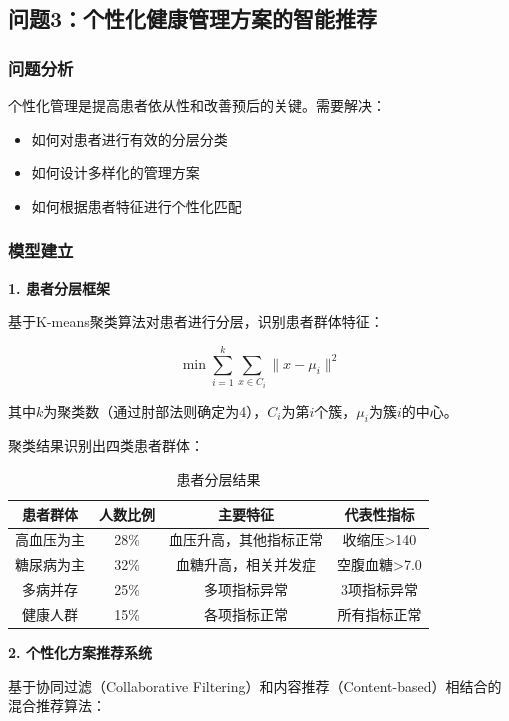 \subsection{问题3：个性化健康管理方案的智能推荐}

\subsubsection{问题分析}

个性化管理是提高患者依从性和改善预后的关键。需要解决：
\begin{itemize}[itemindent=2em]
\item 如何对患者进行有效的分层分类
\item 如何设计多样化的管理方案
\item 如何根据患者特征进行个性化匹配
\end{itemize}

\subsubsection{模型建立}

\textbf{1. 患者分层框架}

基于K-means聚类算法对患者进行分层，识别患者群体特征：

$$\min \sum_{i=1}^{k} \sum_{x \in C_i} \|x - \mu_i\|^2$$

其中$k$为聚类数（通过肘部法则确定为4），$C_i$为第$i$个簇，$\mu_i$为簇$i$的中心。

聚类结果识别出四类患者群体：
\begin{table}[H]
  \centering
  \caption{患者分层结果}
  \label{tab:patient_segmentation}
  \begin{tabularx}{\textwidth}{CCCC}
    \toprule
    患者群体 & 人数比例 & 主要特征 & 代表性指标 \\
    \midrule
    高血压为主 & 28\% & 血压升高，其他指标正常 & 收缩压>140 \\
    糖尿病为主 & 32\% & 血糖升高，相关并发症 & 空腹血糖>7.0 \\
    多病并存 & 25\% & 多项指标异常 & 3项指标异常 \\
    健康人群 & 15\% & 各项指标正常 & 所有指标正常 \\
    \bottomrule
  \end{tabularx}
\end{table}

\textbf{2. 个性化方案推荐系统}

基于协同过滤（Collaborative Filtering）和内容推荐（Content-based）相结合的混合推荐算法：

